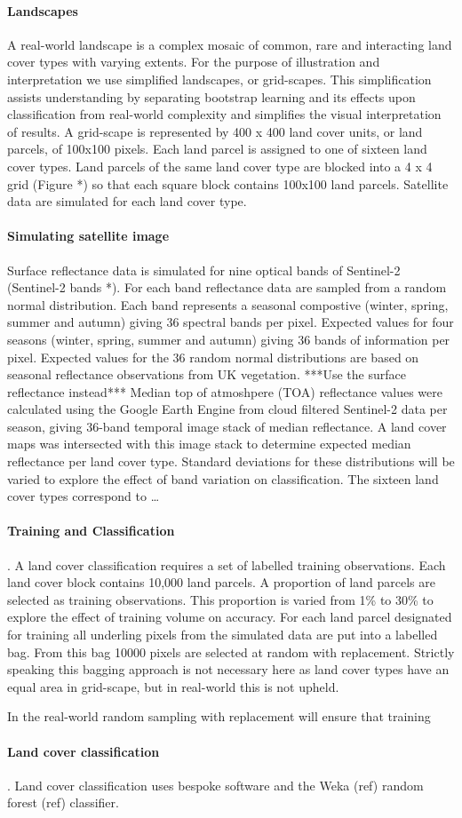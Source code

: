 \paragraph{Landscapes}
A real-world landscape is a complex mosaic of common, rare and interacting land cover types with varying extents.  For the purpose of illustration and interpretation we use simplified landscapes, or grid-scapes. This simplification assists understanding by separating bootstrap learning and its effects upon classification from real-world complexity and simplifies the visual interpretation of results. A grid-scape is represented by 400 x 400 land cover units, or land parcels, of 100x100 pixels.  Each land parcel is assigned to one of sixteen land cover types.  Land parcels of the same land cover type are blocked into a 4 x 4 grid (Figure *) so that each square block contains 100x100 land parcels.  Satellite data are simulated for each land cover type.


\paragraph{Simulating satellite image}
Surface reflectance data is simulated for nine optical bands of Sentinel-2 (Sentinel-2 bands  *).  For each band reflectance data are sampled from a random normal distribution.  Each band represents a seasonal compostive (winter, spring, summer and autumn) giving 36 spectral bands per pixel.  Expected values 
 for four seasons (winter, spring, summer and autumn) giving 36 bands of information per pixel.  Expected values for the 36 random normal distributions are based on seasonal reflectance observations from UK vegetation.  ***Use the surface reflectance instead*** Median top of atmoshpere (TOA) reflectance values were calculated using the Google Earth Engine from cloud filtered Sentinel-2 data per season, giving 36-band temporal image stack of median reflectance.  A land cover maps was intersected with this image stack to determine expected median reflectance per land cover type. Standard deviations for these distributions will be varied to explore the effect of band variation on classification. The sixteen land cover types correspond to \ldots



\paragraph{Training and Classification}.  A land cover classification requires a set of labelled training observations. Each land cover block contains 10,000 land parcels.  A proportion of land parcels are selected as training observations.  This proportion is varied from 1\% to 30\% to explore the effect of training volume on accuracy.  For each land parcel designated for training all underling pixels from the simulated data are put into a labelled bag.  From this bag 10000 pixels are selected at random with replacement.  Strictly speaking this bagging approach is not necessary here as land cover types have an equal area in grid-scape, but in real-world this is not upheld.  

In the real-world random sampling with replacement will ensure that training 

\paragraph{Land cover classification}.  Land cover classification uses bespoke software and the Weka (ref) random forest (ref) classifier.  
 